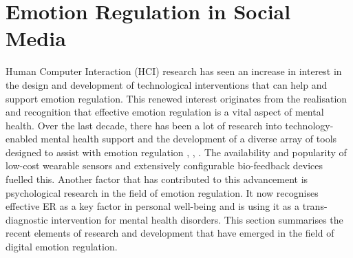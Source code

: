 \documentclass[lettersize,journal]{IEEEtran}
\begin{document}
\section{Emotion Regulation in Social Media}
Human Computer Interaction (HCI) research has seen an increase in interest in the design and development of technological interventions that can help and support emotion regulation. This renewed interest originates from the realisation and recognition that effective emotion regulation is a vital aspect of mental health. Over the last decade, there has been a lot of research into technology-enabled mental health support and the development of a diverse array of tools designed to assist with emotion regulation \cite{wadley2020digital}, \cite{smith2022digital}, \cite{slovak2022designing}. The availability and popularity of low-cost wearable sensors and extensively configurable bio-feedback devices fuelled this. Another factor that has contributed to this advancement is psychological research in the field of emotion regulation. It now recognises effective ER as a key factor in personal well-being and is using it as a trans-diagnostic intervention for mental health disorders. This section summarises the recent elements of research and development that have emerged in the field of digital emotion regulation. 
\end{document}
